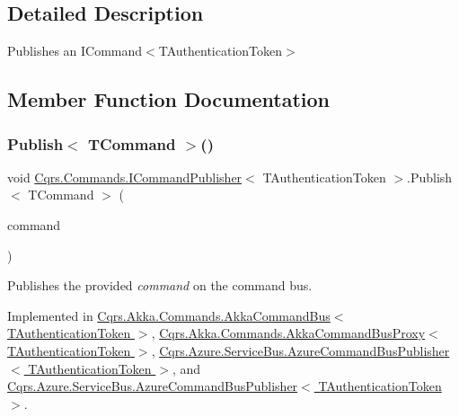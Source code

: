 \subsection{Detailed Description}
Publishes an I\+Command$<$\+T\+Authentication\+Token$>$ 



\subsection{Member Function Documentation}
\mbox{\label{interfaceCqrs_1_1Commands_1_1ICommandPublisher_aeeb487ad5686d9c44d214b1daaf7833a_aeeb487ad5686d9c44d214b1daaf7833a}} 
\subsubsection{\texorpdfstring{Publish$<$ T\+Command $>$()}{Publish< TCommand >()}\hspace{0.1cm}{\footnotesize\ttfamily [1/2]}}
{\footnotesize\ttfamily void \hyperlink{interfaceCqrs_1_1Commands_1_1ICommandPublisher}{Cqrs.\+Commands.\+I\+Command\+Publisher}$<$ T\+Authentication\+Token $>$.Publish$<$ T\+Command $>$ (\begin{DoxyParamCaption}\item[{T\+Command}]{command }\end{DoxyParamCaption})}



Publishes the provided {\itshape command}  on the command bus. 



Implemented in \hyperlink{classCqrs_1_1Akka_1_1Commands_1_1AkkaCommandBus_a48e1d46035b1e1a3251636b8a03f7dae_a48e1d46035b1e1a3251636b8a03f7dae}{Cqrs.\+Akka.\+Commands.\+Akka\+Command\+Bus$<$ T\+Authentication\+Token $>$}, \hyperlink{classCqrs_1_1Akka_1_1Commands_1_1AkkaCommandBusProxy_a410c0fe52016d04de950b1ae767d2ccb_a410c0fe52016d04de950b1ae767d2ccb}{Cqrs.\+Akka.\+Commands.\+Akka\+Command\+Bus\+Proxy$<$ T\+Authentication\+Token $>$}, \hyperlink{classCqrs_1_1Azure_1_1ServiceBus_1_1AzureCommandBusPublisher_aefdaed600f88cc645a1b7ab41db42a69_aefdaed600f88cc645a1b7ab41db42a69}{Cqrs.\+Azure.\+Service\+Bus.\+Azure\+Command\+Bus\+Publisher$<$ T\+Authentication\+Token $>$}, and \hyperlink{classCqrs_1_1Azure_1_1ServiceBus_1_1AzureCommandBusPublisher_aefdaed600f88cc645a1b7ab41db42a69_aefdaed600f88cc645a1b7ab41db42a69}{Cqrs.\+Azure.\+Service\+Bus.\+Azure\+Command\+Bus\+Publisher$<$ T\+Authentication\+Token $>$}.

